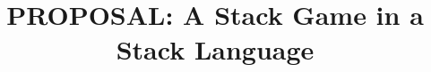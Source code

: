 \documentclass{sig-alternate}
\begin{document}
 \sloppy

%

\title{PROPOSAL: A Stack Game in a Stack Language}
%
%
%
%
%
\end{document}
